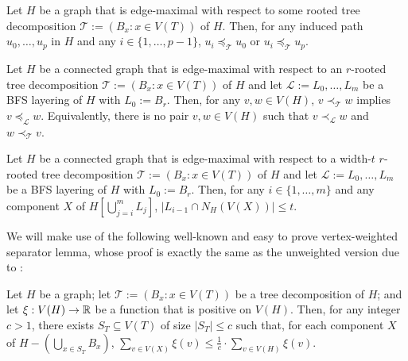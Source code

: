 \documentclass[kpfonts]{patmorin}
\theoremstyle{named}
\begin{document}
 \begin{obs}\label{induced-unimodal}
     Let $H$ be a graph that is edge-maximal with respect to some rooted tree decomposition $\mathcal{T}:=(B_x:x\in V(T))$ of $H$.  Then, for any induced path $u_0,\ldots,u_p$ in $H$ and any $i\in\{1,\ldots,p-1\}$, $u_i\preceq_\mathcal{T} u_0$ or $u_i\preceq_\mathcal{T} u_p$.
 \end{obs}


\begin{obs}\label{order-relation}
    Let $H$ be a connected graph that is edge-maximal with respect to an $r$-rooted tree decomposition $\mathcal{T}:=(B_x:x\in V(T))$ of $H$ and let $\mathcal{L}:=L_0,\ldots,L_m$ be a BFS layering of $H$ with $L_0:=B_r$.  Then, for any $v,w\in V(H)$, $v\prec_{\mathcal{T}}w$ implies $v\preceq_{\mathcal{L}}w$. Equivalently, there is no pair $v,w\in V(H)$ such that $v\prec_{\mathcal{L}}w$ and $w\prec_{\mathcal{T}}v$.
\end{obs}

\begin{obs}\label{up-neighbours}
    Let $H$ be a connected graph that is edge-maximal with respect to a width-$t$ $r$-rooted tree decomposition $\mathcal{T}:=(B_x:x\in V(T))$ of $H$ and let $\mathcal{L}:=L_0,\ldots,L_m$ be a BFS layering of $H$ with $L_0:=B_r$. Then, for any $i\in\{1,\ldots,m\}$ and any component $X$ of $H[\bigcup_{j=i}^m L_j]$, $|L_{i-1}\cap N_H(V(X))|\le t$.
\end{obs}



We will make use of the following well-known and easy to prove vertex-weighted separator lemma, whose proof is exactly the same as the unweighted version due to \citet{robertson.seymour:graph}:

\begin{lem}\label{weighted-separator}
    Let $H$ be a graph; let $\mathcal{T}:=(B_x:x\in V(T))$ be a tree decomposition of $H$; and let $\xi:V(H)\to\mathbb{R}$ be a function that is positive on $V(H)$.  Then, for any integer $c>1$, there exists $S_T\subseteq V(T)$ of size $|S_T|\le c$ such that, for each component $X$ of $H-(\bigcup_{x\in S_T} B_x)$, $\sum_{v\in V(X)} \xi(v) \le \tfrac{1}{c}\cdot\sum_{v\in V(H)} \xi(v)$.
\end{lem}
\end{document}
